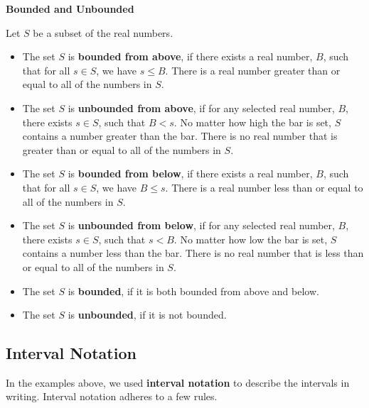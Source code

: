 \documentclass{ximera}
\begin{document}
\begin{definition} \item \textbf{\textcolor{green!50!black}{Bounded and Unbounded}}

Let $S$ be a subset of the real numbers. 


\begin{itemize}
\item The set $S$ is \textbf{bounded from above}, if there exists a real number, $B$, such that for all $s \in S$, we have $s \leq B$.  There is a real number greater than or equal to all of the numbers in $S$.  

\item The set $S$ is \textbf{unbounded from above}, if for any selected real number, $B$, there exists $s \in S$, such that $B < s$. No matter how high the bar is set, $S$ contains a number greater than the bar.  There is no real number that is greater than or equal to all of the numbers in $S$. 

\item The set $S$ is \textbf{bounded from below}, if there exists a real number, $B$, such that for all $s \in S$, we have $B \leq s$.  There is a real number less than or equal to all of the numbers in $S$.  

\item The set $S$ is \textbf{unbounded from below}, if for any selected real number, $B$, there exists $s \in S$, such that $s < B$. No matter how low the bar is set, $S$ contains a number less than the bar.  There is no real number that is less than or equal to all of the numbers in $S$.  

\item The set $S$ is \textbf{bounded}, if it is both bounded from above and below.  

\item The set $S$ is \textbf{unbounded}, if it is not bounded.  
\end{itemize}


\end{definition}






\subsection*{Interval Notation}

In the examples above, we used \textbf{interval notation} to describe the intervals in writing. Interval notation adheres to a few rules.
\end{document}
